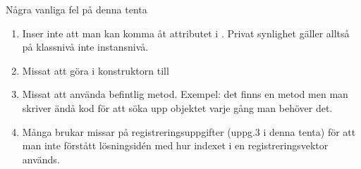 \documentclass{lecturenotes}
\begin{document}
\begin{Slide}{Några vanliga fel på denna tenta}\footnotesize
\begin{enumerate}
\item Inser inte att man kan komma åt attributet  i . Privat synlighet gäller alltså på klassnivå inte instansnivå.
\item Missat att göra  i konstruktorn till 
\item Missat att använda befintlig metod. Exempel: det finns en metod  men man skriver ändå kod för att söka upp objektet varje gång man behöver det.
\item Många brukar missar på registreringsuppgifter (uppg.3 i denna tenta) för att man inte förstått lösningsidén med hur indexet i en registreringsvektor används.
\end{enumerate}
\end{Slide}
\end{document}
